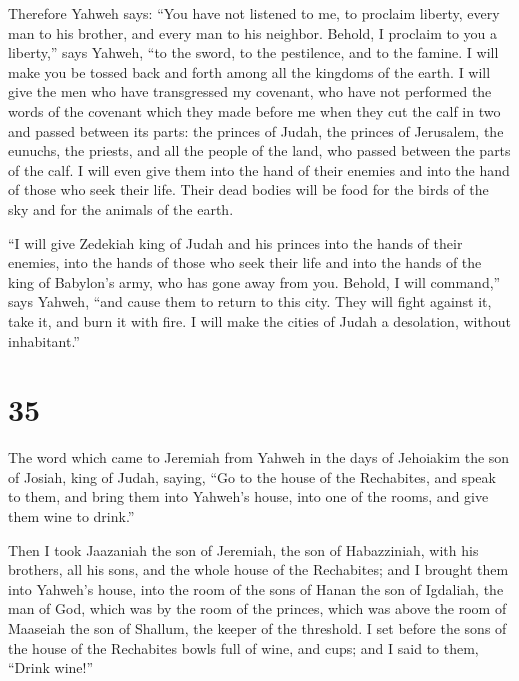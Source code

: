  Therefore Yahweh says: ``You have not listened to me, to
proclaim liberty, every man to his brother, and every man to his
neighbor. Behold, I proclaim to you a liberty,'' says Yahweh, ``to the
sword, to the pestilence, and to the famine. I will make you be tossed
back and forth among all the kingdoms of the earth.  I
will give the men who have transgressed my covenant, who have not
performed the words of the covenant which they made before me when they
cut the calf in two and passed between its parts:  the
princes of Judah, the princes of Jerusalem, the eunuchs, the priests,
and all the people of the land, who passed between the parts of the
calf.  I will even give them into the hand of their
enemies and into the hand of those who seek their life. Their dead
bodies will be food for the birds of the sky and for the animals of the
earth.

 ``I will give Zedekiah king of Judah and his princes
into the hands of their enemies, into the hands of those who seek their
life and into the hands of the king of Babylon's army, who has gone away
from you.  Behold, I will command,'' says Yahweh, ``and
cause them to return to this city. They will fight against it, take it,
and burn it with fire. I will make the cities of Judah a desolation,
without inhabitant.''

\hypertarget{section-34}{%
\section{35}\label{section-34}}

 The word which came to Jeremiah from Yahweh in the days
of Jehoiakim the son of Josiah, king of Judah, saying, 
``Go to the house of the Rechabites, and speak to them, and bring them
into Yahweh's house, into one of the rooms, and give them wine to
drink.''

 Then I took Jaazaniah the son of Jeremiah, the son of
Habazziniah, with his brothers, all his sons, and the whole house of the
Rechabites;  and I brought them into Yahweh's house, into
the room of the sons of Hanan the son of Igdaliah, the man of God, which
was by the room of the princes, which was above the room of Maaseiah the
son of Shallum, the keeper of the threshold.  I set before
the sons of the house of the Rechabites bowls full of wine, and cups;
and I said to them, ``Drink wine!''

